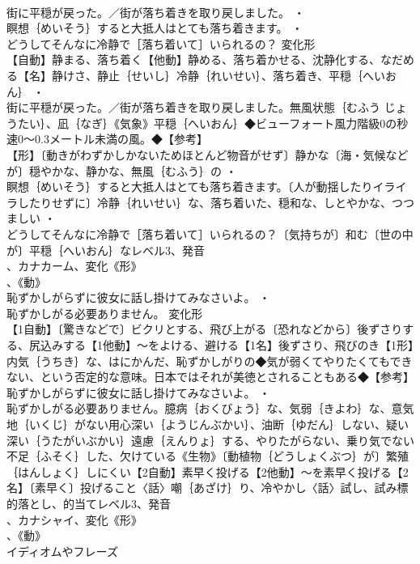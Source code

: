 \documentclass[8pt]{extreport}
\begin{document}
\begin{CJK}{UTF8}{min}
\\	街に平穏が戻った。／街が落ち着きを取り戻しました。 ・
\\	瞑想｛めいそう｝すると大抵人はとても落ち着きます。 ・
\\	どうしてそんなに冷静で［落ち着いて］いられるの？	変化形 
\\	【自動】静まる、落ち着く【他動】静める、落ち着かせる、沈静化する、なだめる【名】静けさ、静止｛せいし｝冷静｛れいせい｝、落ち着き、平穏｛へいおん｝ ・
\\	街に平穏が戻った。／街が落ち着きを取り戻しました。無風状態｛むふう じょうたい｝、凪｛なぎ｝《気象》平穏｛へいおん｝◆ビューフォート風力階級0の秒速0～0.3メートル未満の風。◆【参考】
\\	【形】〔動きがわずかしかないためほとんど物音がせず〕静かな〔海・気候などが〕穏やかな、静かな、無風｛むふう｝の ・
\\	瞑想｛めいそう｝すると大抵人はとても落ち着きます。〔人が動揺したりイライラしたりせずに〕冷静｛れいせい｝な、落ち着いた、穏和な、しとやかな、つつましい ・
\\	どうしてそんなに冷静で［落ち着いて］いられるの？〔気持ちが〕和む〔世の中が〕平穏｛へいおん｝なレベル3、発音
\\	、カナカーム、変化《形》
\\	、《動》
\\	恥ずかしがらずに彼女に話し掛けてみなさいよ。 ・
\\	恥ずかしがる必要ありません。	変化形 
\\	【1自動】〔驚きなどで〕ビクリとする、飛び上がる〔恐れなどから〕後ずさりする、尻込みする【1他動】～をよける、避ける【1名】後ずさり、飛びのき【1形】内気｛うちき｝な、はにかんだ、恥ずかしがりの◆気が弱くてやりたくてもできない、という否定的な意味。日本ではそれが美徳とされることもある◆【参考】
\\	恥ずかしがらずに彼女に話し掛けてみなさいよ。 ・
\\	恥ずかしがる必要ありません。臆病｛おくびょう｝な、気弱｛きよわ｝な、意気地｛いくじ｝がない用心深い｛ようじんぶかい｝、油断｛ゆだん｝しない、疑い深い｛うたがいぶかい｝遠慮｛えんりょ｝する、やりたがらない、乗り気でない不足｛ふそく｝した、欠けている《生物》〔動植物｛どうしょくぶつ｝が〕繁殖｛はんしょく｝しにくい【2自動】素早く投げる【2他動】～を素早く投げる【2名】〔素早く〕投げること〈話〉嘲｛あざけ｝り、冷やかし〈話〉試し、試み標的落とし、的当てレベル3、発音
\\	、カナシャイ、変化《形》
\\	、《動》
\\	イディオムやフレーズ 

\end{CJK}
\end{document}
